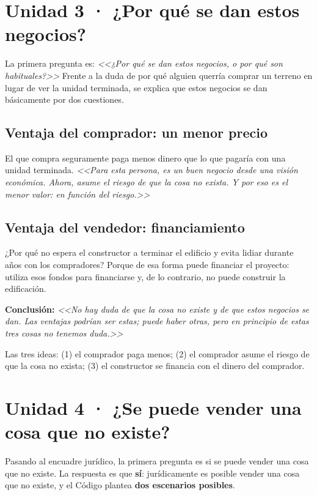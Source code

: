 \documentclass[12pt,oneside]{book}
\begin{document}
\section{Unidad 3 · ¿Por qué se dan estos negocios?}

La primera pregunta es: \textit{<<¿Por qué se dan estos negocios, o por qué son habituales?>>} Frente a la duda de por qué alguien querría comprar un terreno en lugar de ver la unidad terminada, se explica que estos negocios se dan básicamente por dos cuestiones.

\subsection{Ventaja del comprador: un menor precio}

El que compra seguramente paga menos dinero que lo que pagaría con una unidad terminada. \textit{<<Para esta persona, es un buen negocio desde una visión económica. Ahora, asume el riesgo de que la cosa no exista. Y por eso es el menor valor: en función del riesgo.>>}

\subsection{Ventaja del vendedor: financiamiento}

¿Por qué no espera el constructor a terminar el edificio y evita lidiar durante años con los compradores? Porque de esa forma puede financiar el proyecto: utiliza esos fondos para financiarse y, de lo contrario, no puede construir la edificación.

\begin{important}
\textbf{Conclusión:} \textit{<<No hay duda de que la cosa no existe y de que estos negocios se dan. Las ventajas podrían ser estas; puede haber otras, pero en principio de estas tres cosas no tenemos duda.>>}

Las tres ideas: (1) el comprador paga menos; (2) el comprador asume el riesgo de que la cosa no exista; (3) el constructor se financia con el dinero del comprador.
\end{important}

\section{Unidad 4 · ¿Se puede vender una cosa que no existe?}

Pasando al encuadre jurídico, la primera pregunta es si se puede vender una cosa que no existe. La respuesta es que \textbf{sí}: jurídicamente es posible vender una cosa que no existe, y el Código plantea \textbf{dos escenarios posibles}.
\end{document}
